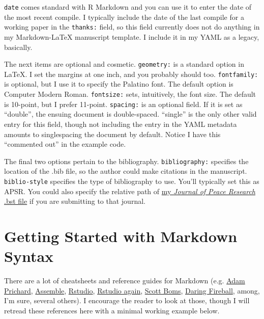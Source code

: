 \documentclass[11pt,]{article}
\begin{document}
\texttt{date} comes standard with R Markdown and you can use it to enter
the date of the most recent compile. I typically include the date of the
last compile for a working paper in the \texttt{thanks:} field, so this
field currently does not do anything in my Markdown-LaTeX manuscript
template. I include it in my YAML as a legacy, basically.

The next items are optional and cosmetic. \texttt{geometry:} is a
standard option in LaTeX. I set the margins at one inch, and you
probably should too. \texttt{fontfamily:} is optional, but I use it to
specify the Palatino font. The default option is Computer Modern Roman.
\texttt{fontsize:} sets, intuitively, the font size. The default is
10-point, but I prefer 11-point. \texttt{spacing:} is an optional field.
If it is set as ``double'', the ensuing document is double-spaced.
``single'' is the only other valid entry for this field, though not
including the entry in the YAML metadata amounts to singlespacing the
document by default. Notice I have this ``commented out'' in the example
code.

The final two options pertain to the bibliography.
\texttt{bibliography:} specifies the location of the .bib file, so the
author could make citations in the manuscript. \texttt{biblio-style}
specifies the type of bibliography to use. You'll typically set this as
APSR. You could also specify the relative path of
\href{http://svmiller.com/miscellany/journal-of-peace-research-bst-file/}{my
\emph{Journal of Peace Research} .bst file} if you are submitting to
that journal.

\hypertarget{getting-started-with-markdown-syntax}{%
\section{Getting Started with Markdown
Syntax}\label{getting-started-with-markdown-syntax}}

There are a lot of cheatsheets and reference guides for Markdown (e.g.
\href{https://github.com/adam-p/markdown-here/wiki/Markdown-Cheatsheet}{Adam
Prichard},
\href{http://assemble.io/docs/Cheatsheet-Markdown.html}{Assemble},
\href{https://www.rstudio.com/wp-content/uploads/2015/02/rmarkdown-cheatsheet.pdf}{Rstudio},
\href{https://www.rstudio.com/wp-content/uploads/2015/03/rmarkdown-reference.pdf}{Rstudio
again},
\href{http://scottboms.com/downloads/documentation/markdown_cheatsheet.pdf}{Scott
Boms}, \href{https://daringfireball.net/projects/markdown/syntax}{Daring
Fireball}, among, I'm sure, several others). I encourage the reader to
look at those, though I will retread these references here with a
minimal working example below.
\end{document}
